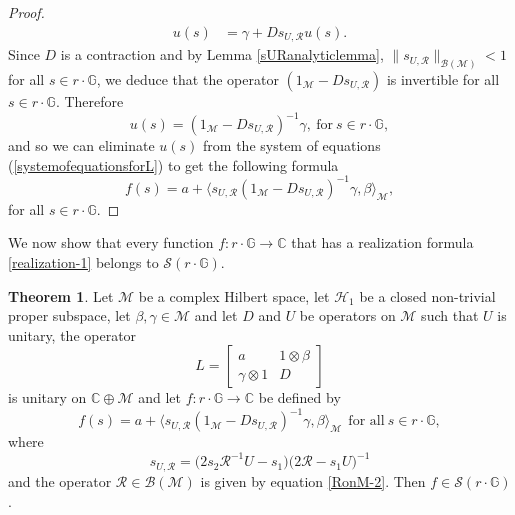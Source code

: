 \documentclass[12pt,reqno]{amsart}
\numberwithin{equation}{section}
\theoremstyle{definition}
\newtheorem{thm}[equation]{Theorem}
\begin{document}
\begin{proof}
\begin{align}
 u(s)&=\gamma+Ds_{U,\mathcal{R}}u(s). \nonumber  
\nonumber
\end{align}
 Since $D$ is a contraction and by Lemma \ref{sURanalyticlemma}, $\|s_{U,\mathcal{R}}\|_{\mathcal{B(M)}}< 1$ for all $s\in r\cdot \mathbb{G}$, we deduce
 that the operator $(1_{\mathcal{M}}-Ds_{U,\mathcal{R}})$ is invertible for all $s\in r\cdot \mathbb{G}$. Therefore 
 $$ u(s) = (1_{\mathcal{M}}-Ds_{U,\mathcal{R}})^{-1}\gamma, \ \text{for} \ s\in r\cdot \mathbb{G},$$ 
 and so  we can eliminate $u(s)$ from the system of equations (\ref{systemofequationsforL}) to get the following formula 
$$f(s)=a+\langle s_{U,\mathcal{R}}(1_{\mathcal{M}}-Ds_{U,\mathcal{R}})^{-1}\gamma, \beta \rangle_{\mathcal{M}},$$
for all $s\in r\cdot \mathbb{G}$. \end{proof}

We now show that every function $f:r\cdot\mathbb{G} \rightarrow \mathbb{C}$ that has a realization formula \eqref{realization-1} belongs to $\mathcal{S}(r\cdot\mathbb{G})$.
\begin{thm}\label{converseforrdotg}
    Let $\mathcal{M}$ be a complex Hilbert space, let $\mathcal{H}_{1}$ be  a closed non-trivial proper subspace,
       let $\beta, \gamma\in\mathcal{M}$ and let $D$ and $U$ be operators on $\mathcal{M}$ such that $U$ is unitary, the operator 
\begin{equation}\label{thisunitarymatrix}
L=\begin{bmatrix}
    a       & 1\otimes \beta \\
    \gamma \otimes 1       & D 
\end{bmatrix}
\end{equation}
is unitary on $\mathbb{C}\oplus \mathcal{M}$ and let $f:r\cdot \mathbb{G}\rightarrow \mathbb{C}$ be defined by
\begin{equation}\label{realizationformulaforthisproof}
f(s)=a+\langle s_{U,\mathcal{R}}(1_{\mathcal{M}}-Ds_{U,\mathcal{R}})^{-1}\gamma, \beta \rangle_{\mathcal{M}}~~\text{for all}~s\in r\cdot\mathbb{G},
\end{equation}
where 
\begin{equation}\label{surequationrealization}
    s_{U,\mathcal{R}} = \bigg(2s_{2}\mathcal{R}^{-1}U-s_{1}\bigg)\bigg(2\mathcal{R}-s_{1}U\bigg)^{-1}
\end{equation}
and  the operator $\mathcal{R}\in\mathcal{B}(\mathcal{M})$ is given by equation \eqref{RonM-2}.
Then $f\in\mathcal{S}(r\cdot\mathbb{G})$.
\end{thm}
\end{document}
